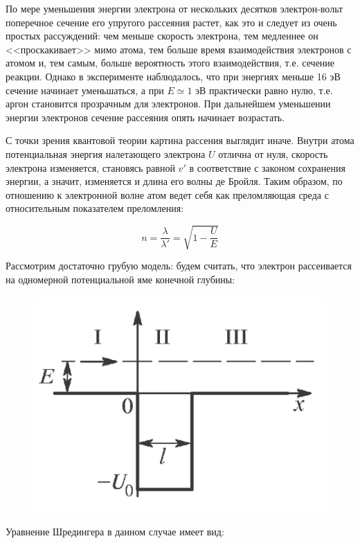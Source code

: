 \documentclass[a4paper, 12pt]{article}%
\begin{document}
	По мере уменьшения энергии электрона от нескольких десятков электрон-вольт поперечное сечение его упругого рассеяния растет,  как это и следует из очень простых рассуждений: чем меньше скорость электрона,  тем медленнее он <<проскакивает>> мимо атома,  тем больше время взаимодействия электронов с атомом и, тем самым, больше вероятность этого взаимодействия, т.е. сечение реакции. Однако в эксперименте наблюдалось, что при энергиях меньше 16 эВ сечение начинает уменьшаться,  а при $E \simeq 1$ эВ практически равно нулю,  т.е. аргон становится прозрачным для электронов.  При дальнейшем уменьшении энергии электронов сечение рассеяния опять начинает возрастать.

	С точки зрения квантовой теории картина рассения выглядит иначе.  Внутри атома потенциальная энергия налетающего электрона $U$ отлична от нуля,  скорость электрона изменяется,  становясь равной $v'$ в соответствие с законом сохранения энергии,  а значит,  изменяется и длина его волны де Бройля.  Таким образом,  по отношению к электронной волне атом ведет себя как преломляющая среда с относительным показателем преломления:
	
\[ n = \dfrac{\lambda}{\lambda'} = \sqrt{1 - \dfrac{U}{E}} \]

	Рассмотрим достаточно грубую модель: будем считать, что электрон рассеивается на одномерной потенциальной яме конечной глубины:

	\begin{figure}[h!]
		\centering
		\includegraphics[scale=0.4]{Схема_1.PNG}
	\end{figure}

Уравнение Шредингера в данном случае имеет вид:
\end{document}
